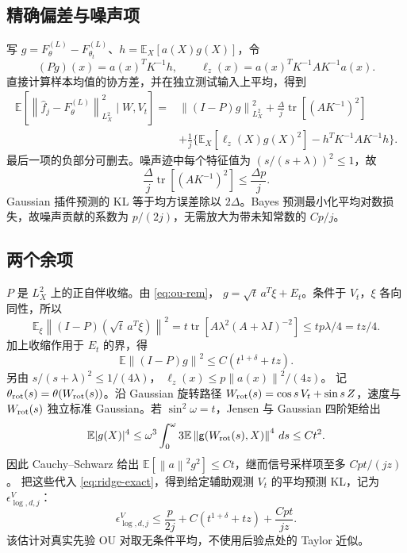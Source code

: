 \documentclass[a4paper]{tufte-handout}
\newcommand{\E}{\mathbb E}
\newcommand{\norm}[1]{\left\|#1\right\|}
\DeclareMathOperator{\tr}{tr}
\begin{document}
\begin{fullwidth}
\subsection{精确偏差与噪声项}
写 $g=F_\theta^{(L)}-F_{\theta_t}^{(L)}$、$h=\E_X[a(X)g(X)]$，令
\[
(Pg)(x)=a(x)^TK^{-1}h,\qquad
\ell_z(x)=a(x)^TK^{-1}AK^{-1}a(x).
\]
直接计算样本均值的协方差，并在独立测试输入上平均，得到
\begin{equation}\label{eq:ridge-exact}\begin{aligned}
\E[\norm{\widehat f_j-F_\theta^{(L)}}_{L_X^2}^2\mid W,V_t]
={}&\norm{(I-P)g}_{L_X^2}^2
+\frac\Delta j\tr[(AK^{-1})^2]\\
&+\frac1j\{\E_X[\ell_z(X)g(X)^2]
-h^TK^{-1}AK^{-1}h\}.
\end{aligned}\end{equation}
最后一项的负部分可删去。噪声迹中每个特征值为 $(s/(s+\lambda))^2\le1$，故
\[
\frac\Delta j\tr[(AK^{-1})^2]\le\frac{\Delta p}{j}.
\]
Gaussian 插件预测的 KL 等于均方误差除以 $2\Delta$。Bayes 预测最小化平均对数损失，故噪声贡献的系数为 $p/(2j)$，无需放大为带未知常数的 $Cp/j$。

\subsection{两个余项}
$P$ 是 $L_X^2$ 上的正自伴收缩。由 \eqref{eq:ou-rem}，
$g=\sqrt t\,a^T\xi+E_t$。条件于 $V_t$，$\xi$ 各向同性，所以
\[
\E_\xi\norm{(I-P)(\sqrt t\,a^T\xi)}^2
=t\tr[A\lambda^2(A+\lambda I)^{-2}]
\le tp\lambda/4=tz/4.
\]
加上收缩作用于 $E_t$ 的界，得
\[
\E\norm{(I-P)g}^2\le C(t^{1+\delta}+tz).
\]
另由 $s/(s+\lambda)^2\le1/(4\lambda)$，
$\ell_z(x)\le p\norm{a(x)}^2/(4z)$。
记 $\theta_{\rm rot}(s)=\theta(W_{\rm rot}(s))$。沿 Gaussian 旋转路径 $W_{\rm rot}(s)=\cos s\,V_t+\sin s\,Z$，速度与 $W_{\rm rot}(s)$ 独立标准 Gaussian。若 $\sin^2\omega=t$，Jensen 与 Gaussian 四阶矩给出
\[
\E|g(X)|^4
\le\omega^3\int_0^\omega3\E\norm{\mathsf g(W_{\rm rot}(s),X)}^4\,ds
\le Ct^2.
\]
因此 Cauchy--Schwarz 给出
$\E[\norm a^2g^2]\le Ct$，继而信号采样项至多 $Cpt/(jz)$。
把这些代入 \eqref{eq:ridge-exact}，得到给定辅助观测 $V_t$ 的平均预测 KL，记为 $\epsilon^V_{\log,d,j}$：
\begin{equation}\label{eq:oracle}
\epsilon^V_{\log,d,j}\le\frac p{2j}
+C(t^{1+\delta}+tz)+\frac{Cpt}{jz}.
\end{equation}
该估计对真实先验 OU 对取无条件平均，不使用后验点处的 Taylor 近似。


\end{fullwidth}
\end{document}
